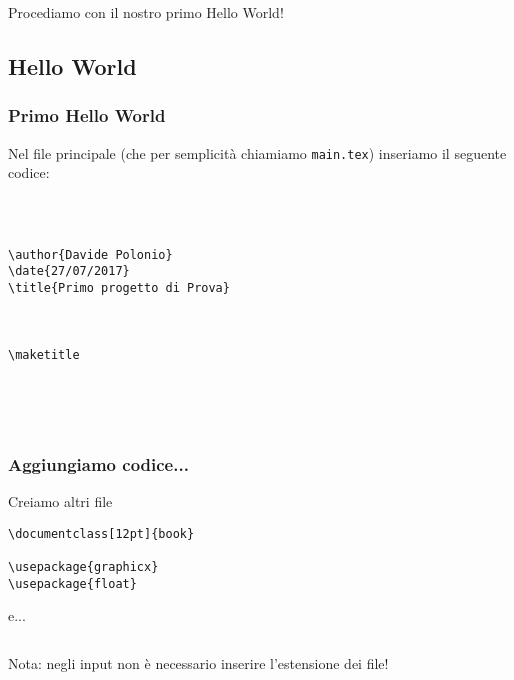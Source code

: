 \begin{frame}
 
\huge Procediamo con il nostro primo Hello World!
\end{frame}

\subsection{Hello World}
\begin{frame}[fragile]

\frametitle{Primo Hello World}
 
 Nel file principale (che per semplicità chiamiamo \texttt{main.tex}) inseriamo 
il seguente codice:

\begin{lstlisting}[frame = single, title={File main.tex}] 



\author{Davide Polonio}
\date{27/07/2017}
\title{Primo progetto di Prova}



\maketitle



 
\end{lstlisting}

\end{frame}

\begin{frame}[fragile]
 
 \frametitle{Aggiungiamo codice...}
 
 Creiamo altri file
 
 \begin{lstlisting}[frame = single, title={File res/config/package.tex}]
\documentclass[12pt]{book}

\usepackage{graphicx}
\usepackage{float}
 \end{lstlisting}

 e...
 
 \begin{lstlisting}[frame = single, title={File res/listOfSections.tex}]

 \end{lstlisting}

Nota: negli input non è necessario inserire l'estensione dei file! 
\end{frame}

